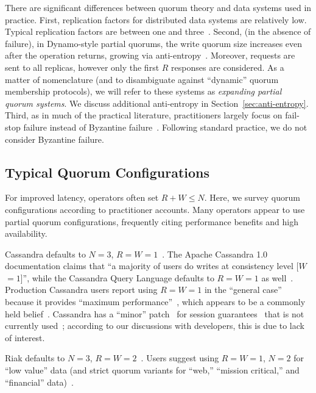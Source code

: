 \documentclass{vldb}
\newcommand{\subsectionskip}{-0em}
\begin{document}
There are significant differences between quorum theory and data
systems used in practice.  First, replication factors for distributed
data systems are relatively low.  Typical replication factors are
between one and three~\cite{cassandradefault, feinbergpc, codapc}.
Second, (in the absence of failure), in Dynamo-style partial quorums,
the write quorum size increases even after the operation returns,
growing via anti-entropy~\cite{antientropy}.  Moreover, requests are
sent to all replicas, however only the first $R$ responses are
considered.  As a matter of nomenclature (and to disambiguate against
``dynamic'' quorum membership protocols), we will refer to these
systems as \textit{expanding partial quorum systems}. We discuss
additional anti-entropy in Section~\ref{sec:anti-entropy}. Third, as
in much of the practical literature, practitioners largely focus on
fail-stop failure instead of Byzantine
failure~\cite{birman-byzantine}.  Following standard practice, we do
not consider Byzantine failure.

\vspace{2em}

\vspace{\subsectionskip}\subsection{Typical Quorum Configurations}

For improved latency, operators often set $R+W \leq N$.  Here, we
survey quorum configurations according to practitioner accounts.  Many
operators appear to use partial quorum configurations, frequently
citing performance benefits and high availability.

Cassandra defaults to $N$$=$$3$,
$R$$=$$W$$=$$1$~\cite{cassandradefault}. The Apache Cassandra 1.0
documentation claims that ``a majority of users do writes at
consistency level [$W$$=$$1$]'', while the Cassandra Query Language
defaults to $R$$=$$W$$=$$1$ as well~\cite{cassandra-docs}.  Production
Cassandra users report using $R$$=$$W$$=$$1$ in the ``general case''
because it provides ``maximum performance''~\cite{maxperfblog}, which
appears to be a commonly held belief~\cite{reddit, outbrain}.
Cassandra has a ``minor'' patch~\cite{cassandra-session} for session
guarantees~\cite{sessionguarantees} that is not currently
used~\cite{cassandra-session-revert}; according to our
discussions with developers, this is due to lack of interest.

Riak defaults to $N$$=$$3$, $R$$=$$W$$=$$2$~\cite{riakdefault-n,
  riakdefault-rw}. Users suggest using $R$$=$$W$$=$$1$, $N$$=$$2$ for
``low value'' data (and strict quorum variants for ``web,''
``mission critical,'' and ``financial'' data)~\cite{riaktalkone,
  riaktalktwo}.
\end{document}
